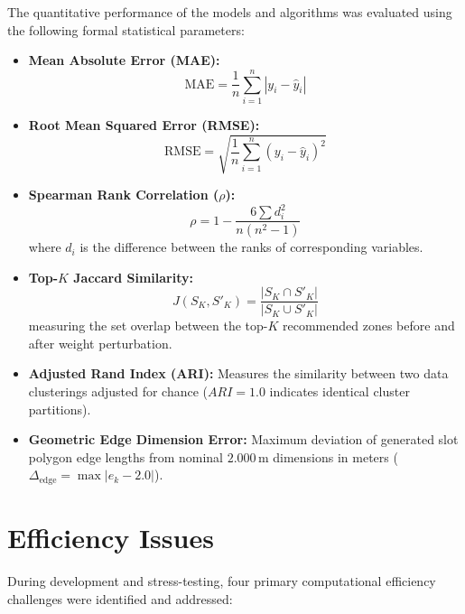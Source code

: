 The quantitative performance of the models and algorithms was evaluated using the following formal statistical parameters:

\begin{itemize}
    \item \textbf{Mean Absolute Error (MAE):}
    \begin{equation}
        \text{MAE} = \frac{1}{n} \sum_{i=1}^n |y_i - \hat{y}_i|
    \end{equation}
    \item \textbf{Root Mean Squared Error (RMSE):}
    \begin{equation}
        \text{RMSE} = \sqrt{\frac{1}{n} \sum_{i=1}^n (y_i - \hat{y}_i)^2}
    \end{equation}
    \item \textbf{Spearman Rank Correlation ($\rho$):}
    \begin{equation}
        \rho = 1 - \frac{6 \sum d_i^2}{n(n^2 - 1)}
    \end{equation}
    where $d_i$ is the difference between the ranks of corresponding variables.
    \item \textbf{Top-$K$ Jaccard Similarity:}
    \begin{equation}
        J(S_K, S'_K) = \frac{|S_K \cap S'_K|}{|S_K \cup S'_K|}
    \end{equation}
    measuring the set overlap between the top-$K$ recommended zones before and after weight perturbation.
    \item \textbf{Adjusted Rand Index (ARI):} Measures the similarity between two data clusterings adjusted for chance ($ARI = 1.0$ indicates identical cluster partitions).
    \item \textbf{Geometric Edge Dimension Error:} Maximum deviation of generated slot polygon edge lengths from nominal $2.000\,\text{m}$ dimensions in meters ($\Delta_{\text{edge}} = \max |e_k - 2.0|$).
\end{itemize}

\section{Efficiency Issues}
\label{sec:efficiency_issues}

During development and stress-testing, four primary computational efficiency challenges were identified and addressed:

